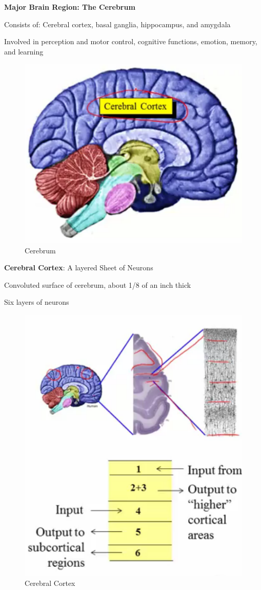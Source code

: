 \documentclass{book}
\begin{document}
 
\textbf{Major Brain Region: The Cerebrum}

Consists of: Cerebral cortex, basal ganglia, hippocampus, and amygdala

Involved in perception and motor control, cognitive functions, emotion, memory, and learning

\begin{figure}[h]
\centering
\includegraphics[width=0.7\linewidth]{./figures/cerebrum}
\caption{Cerebrum}
\label{fig:cerebrum}
\end{figure}


\textbf{Cerebral Cortex}: A layered Sheet of Neurons

Convoluted surface of cerebrum, about 1/8 of an inch thick

Six layers of neurons

\begin{figure}[h]
\centering
\includegraphics[width=0.7\linewidth]{./figures/cerabral}
\caption{Cerebral Cortex}
\label{fig:cerabral}
\end{figure}



\pagebreak





 
\end{document}
